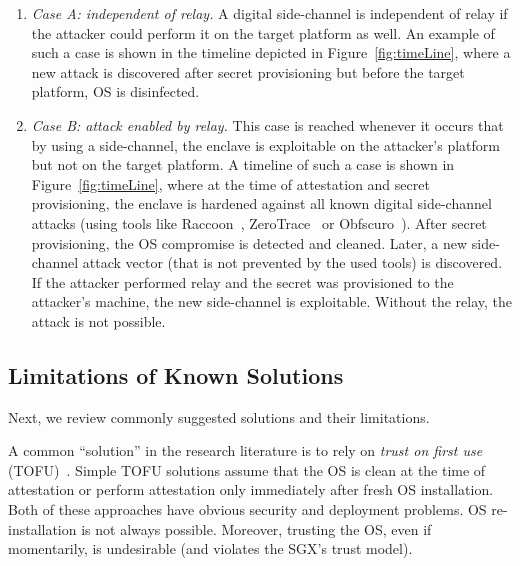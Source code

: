 \begin{enumerate}
    \item[]\emph{Case A: independent of relay.} A digital side-channel is independent of relay if the attacker could perform it on the target platform as well. An example of such a case is shown in the timeline depicted in Figure~\ref{fig:timeLine}, where a new attack is discovered after secret provisioning but before the target platform, OS is disinfected.
    

    \item[]\emph{Case B: attack enabled by relay.} This case is reached whenever it occurs that by using a side-channel, the enclave is exploitable on the attacker's platform but not on the target platform. 
    A timeline of such a case is shown in Figure~\ref{fig:timeLine}, where at the time of attestation and secret provisioning, the enclave is hardened against all known digital side-channel attacks (using tools like Raccoon~\cite{raccoon}, ZeroTrace~\cite{zerotrace} or Obfscuro~\cite{obfscuro}). After secret provisioning, the OS compromise is detected and cleaned. Later, a new side-channel attack vector (that is not prevented by the used tools) is discovered. If the attacker performed relay and the secret was provisioned to the attacker's machine, the new side-channel is exploitable. Without the relay, the attack is not possible.
    

\end{enumerate}


\subsection{Limitations of Known Solutions}
\label{sec:problemStatement:limitations}

Next, we review commonly suggested solutions and their limitations.

A common ``solution'' in the research literature is to rely on \emph{trust on first use} (TOFU)~\cite{tofu}. Simple TOFU solutions assume that the OS is clean at the time of attestation or perform attestation only immediately after fresh OS installation. Both of these approaches have obvious security and deployment problems. OS re-installation is not always possible. Moreover, trusting the OS, even if momentarily, is undesirable (and violates the SGX's trust model).

